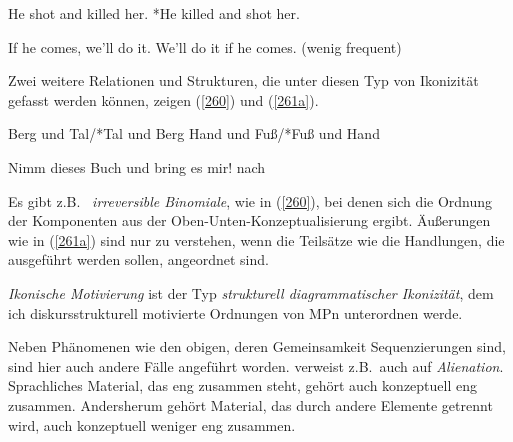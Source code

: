 \begin{exe}
	\ex\label{258} 
		\begin{xlist}	
			\ex\label{258a} He shot and killed her.
			\ex\label{258b} *He killed and shot her.
			\hfill\hbox{\citet[92]{Givon1991}}
		\end{xlist}
\end{exe}

\begin{exe}
	\ex\label{259} 
		\begin{xlist}	
			\ex\label{259a} If he comes, we'll do it.
			\ex\label{259b} We'll do it if he comes. (wenig frequent)
			\hfill\hbox{\citet[93]{Givon1991}}
		\end{xlist}
\end{exe}
Zwei weitere Relationen und Strukturen, die unter diesen Typ von Ikonizität gefasst werden können, zeigen (\ref{260}) und (\ref{261a}).

\begin{exe}
	\ex\label{260} 
		\begin{xlist}	
			\ex\label{260a} Berg und Tal/*Tal und Berg
			\ex\label{260b} Hand und Fuß/*Fuß und Hand	
			\hfill\hbox{\citet[140--141]{Plank1979}}
		\end{xlist}
\end{exe}

\begin{exe}
	\ex\label{261a} 
		Nimm dieses Buch und bring es mir!
		\hfill\hbox{nach \citet[161]{Simone1995}}
\end{exe}
Es gibt z.B.\  \textit{irreversible Binomiale}, wie in (\ref{260}), bei denen sich die Ordnung der Komponenten aus der Oben-Unten-Konzeptualisierung ergibt. Äußerungen wie in (\ref{261a}) sind nur zu verstehen, wenn die Teilsätze wie die Handlungen, die ausgeführt werden sollen, angeordnet sind.

\textit{Ikonische Motivierung} ist der  Typ \textit{strukturell diagrammatischer Ikonizität}, dem ich diskursstrukturell motivierte Ordnungen von MPn unterordnen werde. 

Neben Phänomenen wie den obigen, deren Gemeinsamkeit Sequenzierungen sind, sind hier auch andere Fälle angeführt worden. \citet[191]{Haiman1992} verweist z.B.\ auch auf  \textit{Alienation}. Sprachliches Material, das eng zusammen steht, gehört auch konzeptuell eng zusammen. Andersherum gehört Material, das durch andere Elemente getrennt wird, auch konzeptuell weniger eng zusammen. 

